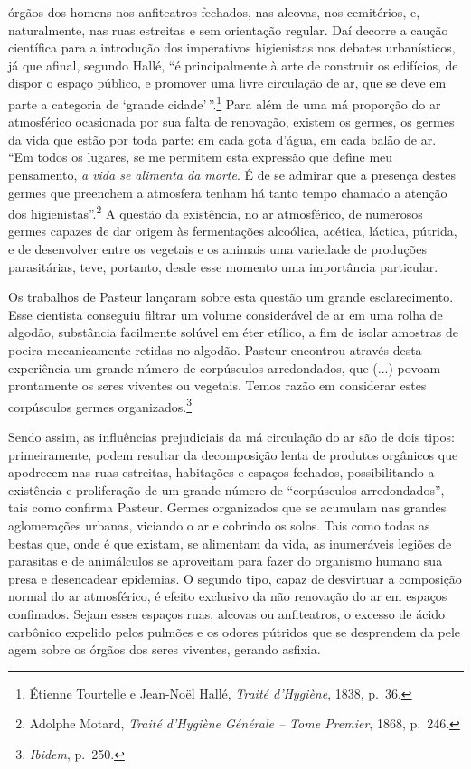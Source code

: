 órgãos dos homens nos anfiteatros fechados, nas alcovas, nos cemitérios,
e, naturalmente, nas ruas estreitas e sem orientação regular. Daí
decorre a caução científica para a introdução dos imperativos
higienistas nos debates urbanísticos, já que afinal, segundo Hallé, ``é
principalmente à arte de construir os edifícios, de dispor o espaço
público, e promover uma livre circulação de ar, que se deve em parte a
categoria de `grande cidade'\,''.\footnote{Étienne Tourtelle e Jean-Noël
  Hallé, \emph{Traité d'Hygiène}, 1838, p.~36.} Para além de uma má
proporção do ar atmosférico ocasionada por sua falta de renovação,
existem os germes, os germes da vida que estão por toda parte: em cada
gota d'água, em cada balão de ar. ``Em todos os lugares, se me permitem
esta expressão que define meu pensamento, \emph{a vida se alimenta da
morte}. É de se admirar que a presença destes germes que preenchem a
atmosfera tenham há tanto tempo chamado a atenção dos
higienistas''.\footnote{Adolphe Motard, \emph{Traité d'Hygiène Générale
  -- Tome Premier}, 1868, p.~246.} A questão da existência, no ar
atmosférico, de numerosos germes capazes de dar origem às fermentações
alcoólica, acética, láctica, pútrida, e de desenvolver entre os vegetais
e os animais uma variedade de produções parasitárias, teve, portanto,
desde esse momento uma importância particular.

Os trabalhos de Pasteur lançaram sobre esta questão um grande
esclarecimento. Esse cientista conseguiu filtrar um volume considerável
de ar em uma rolha de algodão, substância facilmente solúvel em éter
etílico, a fim de isolar amostras de poeira mecanicamente retidas no
algodão. Pasteur encontrou através desta experiência um grande número de
corpúsculos arredondados, que (...) povoam prontamente os seres viventes
ou vegetais. Temos razão em considerar estes corpúsculos germes
organizados.\footnote{\emph{Ibidem}, p.~250.}

Sendo assim, as influências prejudiciais da má circulação do ar são de
dois tipos: primeiramente, podem resultar da decomposição lenta de
produtos orgânicos que apodrecem nas ruas estreitas, habitações e
espaços fechados, possibilitando a existência e proliferação de um
grande número de ``corpúsculos arredondados'', tais como confirma
Pasteur. Germes organizados que se acumulam nas grandes aglomerações
urbanas, viciando o ar e cobrindo os solos. Tais como todas as bestas
que, onde é que existam, se alimentam da vida, as inumeráveis legiões de
parasitas e de animálculos se aproveitam para fazer do organismo humano
sua presa e desencadear epidemias. O segundo tipo, capaz de desvirtuar a
composição normal do ar atmosférico, é efeito exclusivo da não renovação
do ar em espaços confinados. Sejam esses espaços ruas, alcovas ou
anfiteatros, o excesso de ácido carbônico expelido pelos pulmões e os
odores pútridos que se desprendem da pele agem sobre os órgãos dos seres
viventes, gerando asfixia.

